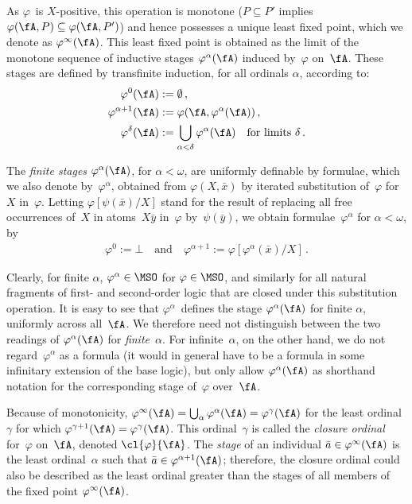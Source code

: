 \documentclass{LMCS}
\begin{document}
As $\varphi$~is $X$-positive, this operation is monotone
($P \subseteq P'$ implies $\varphi(\fA,P) \subseteq \varphi(\fA,P')$)
and hence possesses a unique least fixed point,
which we denote as $\varphi^\infty(\fA)$. This least fixed point
is obtained as the limit of the monotone sequence of inductive stages
$\varphi^\alpha(\fA)$
induced by~$\varphi$ on~$\fA$. These stages are defined by transfinite
induction, for all ordinals $\alpha$, according to\?:
\begin{align*}
  \varphi^0(\fA)          &:= \emptyset\,,  \\
  \varphi^{\alpha+1}(\fA) &:= \varphi(\fA,\varphi^\alpha(\fA))\,, \\
  \varphi^\delta(\fA)     &:= \bigcup_{\alpha < \delta} \varphi^\alpha(\fA)
                              \quad\text{for limits } \delta\,.
\end{align*}

The \emph{finite stages} $\varphi^\alpha(\fA)$, for $\alpha < \omega$,
are uniformly definable by formulae, which we also denote by~$\varphi^\alpha$,
obtained from $\varphi(X,\bar x)$ by iterated substitution
of~$\varphi$ for~$X$ in~$\varphi$.
Letting $\varphi[\psi(\bar x)/X]$ stand for the result of
replacing all free occurrences of~$X$ in atoms~$X\bar y$
in~$\varphi$ by~$\psi(\bar y)$, we obtain
formulae~$\varphi^\alpha$ for $\alpha < \omega$, by
\begin{align*}
  \varphi^0 := \bot
  \quad\text{and}\quad
  \varphi^{\alpha+1} := \varphi[\varphi^\alpha(\bar x)/X]\,.
\end{align*}

Clearly, for finite $\alpha$, $\varphi^\alpha \in \MSO$ for $\varphi \in \MSO$,
and similarly for all natural fragments of first- and second-order logic that
are closed under this substitution operation. It is easy to see that
$\varphi^\alpha$~defines the stage $\varphi^\alpha(\fA)$
for finite $\alpha$, uniformly across all~$\fA$. We therefore need not
distinguish between the two readings of $\varphi^\alpha(\fA)$ for
\emph{finite}~$\alpha$. For infinite~$\alpha$, on the other hand,
we do not regard~$\varphi^\alpha$ as a formula (it would in general have to be
a formula in some infinitary extension of the base logic), but only
allow $\varphi^\alpha(\fA)$ as shorthand notation for the corresponding stage
of~$\varphi$ over~$\fA$.

Because of monotonicity,
$\varphi^\infty(\fA) = \bigcup_\alpha \varphi^\alpha(\fA) = \varphi^\gamma(\fA)$
for the least ordinal~$\gamma$ for which
$\varphi^{\gamma+1}(\fA) = \varphi^\gamma(\fA)$.
This ordinal~$\gamma$ is called the \emph{closure ordinal} for~$\varphi$
on~$\fA$, denoted $\cl{\varphi}{\fA}$.
The \emph{stage} of an individual $\bar a \in \varphi^\infty(\fA)$
is the least ordinal~$\alpha$ such that $\bar a \in \varphi^{\alpha+1}(\fA)$\?;
therefore, the closure ordinal could also be described as the least
ordinal greater than the stages of all members of the fixed point $\varphi^\infty(\fA)$.
\end{document}
